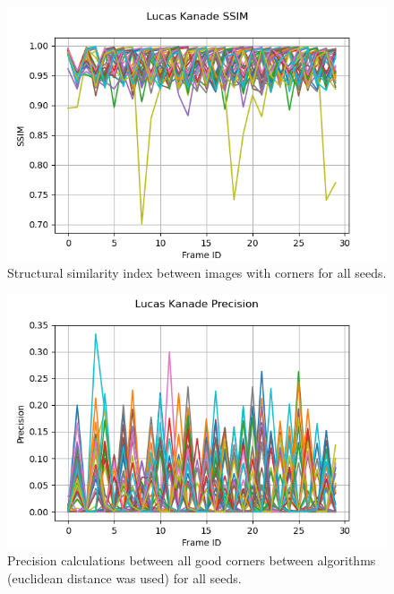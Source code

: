\documentclass[11pt, conference, letterpaper]{IEEEtran}
\begin{document}
\begin{figure}[h]
    \centering
    \includegraphics[width=\linewidth]{mc_images/mc_lk_ssim.png}
    \caption{Structural similarity index between images with corners for all seeds.}
    \label{fig:mc_lk_ssim}
\end{figure}

\begin{figure}[h]
    \centering
    \includegraphics[width=\linewidth]{mc_images/mc_lk_precision.png}
    \caption{Precision calculations between all good corners between algorithms (euclidean distance was used) for all seeds.}
    \label{fig:mc_lk_prec}
\end{figure}
\end{document}
